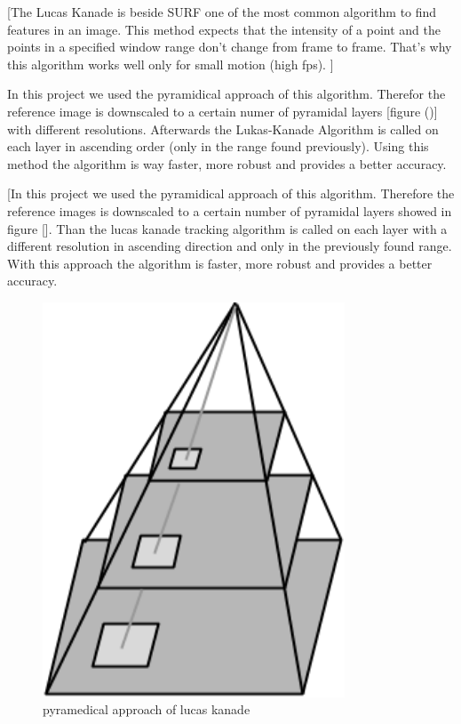\documentclass[11pt]{article}
\begin{document}
			[The Lucas Kanade is beside SURF one of the most common algorithm to find features in an image. This method expects that the intensity of a point and the points in a specified window range don’t change from frame to frame. That's why this algorithm works well only for small motion (high fps). ]

	In this project we used the pyramidical approach of this algorithm. Therefor the reference image is downscaled to a certain numer of pyramidal layers [figure ()] with different resolutions. Afterwards the Lukas-Kanade Algorithm is called on each layer in ascending order (only in the range found previously). Using this method the algorithm is way faster, more robust and provides a better accuracy.

			[In this project we used the pyramidical approach of this algorithm. Therefore the reference images is downscaled to a certain number of pyramidal layers showed in figure []. Than the lucas kanade tracking algorithm is called on each layer with a different resolution in ascending direction and only in the previously found range. With this approach the algorithm is faster, more robust and provides a better accuracy. 

	\begin{figure}[ht!]
		\centering
		\includegraphics[width=90mm]{images/pyramidical.png}
		\caption{pyramedical approach of lucas kanade \label{overflow}}
	\end{figure}
	
\end{document}
